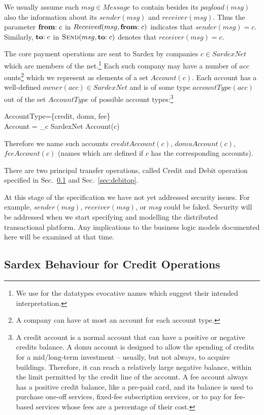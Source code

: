 We usually assume  each $msg \in Message$ to contain besides its $payload(msg)$ also the information about its $sender(msg)$ and $receiver(msg)$. Thus the parameter $\mathrel{\mathbf{from}} :c$ in $Received(msg, \mathrel{\mathbf{from}} :c)$ indicates that $sender(msg)=c$. Similarly, $\mathrel{\mathbf{to}} :c$ in $\hbox{\sc Send}(msg, \mathrel{\mathbf{to}} :c)$ denotes that $receiver(msg) = c$.

The core payment operations are sent to Sardex by companies $c \in SardexNet$ which are members of the net.\footnote{We use for the datatypes evocative names which suggest their intended interpretation.} Each such company may have a number of $acc$ounts\footnote{A company can have at most an account for each account type.} which we represent as elements of a set $Account(c)$. Each $acc$ount has a well-defined $owner(acc) \in SardexNet$ and is of some type $accountType(acc)$ out of the set $AccountType$ of possible account types:\footnote{A credit account is a normal account that can have a positive or negative credits balance. A domu account is designed to allow the spending of credits for a mid/long-term investment -- usually, but not always, to acquire buildings. Therefore, it can reach a relatively large negative balance, within the limit permitted by the credit line of the account. A fee account always has a positive credit balance, like a pre-paid card, and its balance is used to purchase one-off services, fixed-fee subscription services, or to pay for fee-based services whose fees are a percentage of their cost.}

\begin{asm}
AccountType=\{credit, domu, fee\} \\
Account = \bigcup_{c \in SardexNet} Account(c)
\end{asm}
Therefore we name such accounts $creditAccount(c)$, $domuAccount(c)$, $feeAccount(c)$ (names which are defined if $c$ has the corresponding accounts). 

There are two principal transfer operations, called Credit and Debit operation specified in Sec.~\ref{sec:creditop} and Sec.~\ref{sec:debitop}.

At this stage of the specification we have not yet addressed security issues. For example, $sender(msg)$, $receiver(msg)$, or $msg$ could be faked. Security will be addressed when we start specifying and modelling the distributed transactional platform. Any implications to the business logic models documented here will be examined at that time.


\subsection{Sardex Behaviour for Credit Operations}
\label{sec:creditop}

